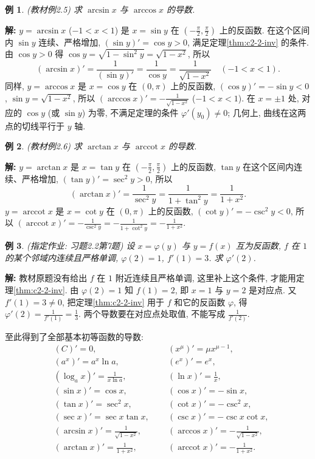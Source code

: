 \documentclass[UTF8,openany]{ctexbook}
\theoremstyle{chinesetextbook}
\newtheorem{example}{例}[section]
\newenvironment{cnsolution}{\par\indent\textbf{解:} \ignorespaces}{\par}
\begin{document}
\begin{example}\label{ex:c2-2-5}
\textnormal{(教材例2.5)} 求 $\arcsin x$ 与 $\arccos x$ 的导数.
\end{example}
\begin{cnsolution}
$y=\arcsin x$ ($-1<x<1$) 是 $x=\sin y$ 在 $\displaystyle\left(-\frac\pi2,\frac\pi2\right)$ 上的反函数. 在这个区间内 $\sin y$ 连续、严格增加, $(\sin y)'=\cos y>0$, 满足定理\ref{thm:c2-2-inv} 的条件. 由 $\cos y>0$ 得 $\cos y=\sqrt{1-\sin^2y}=\sqrt{1-x^2}$, 所以
\[
(\arcsin x)'=\frac1{(\sin y)'}=\frac1{\cos y}=\frac1{\sqrt{1-x^2}}\quad(-1<x<1).
\]
同样, $y=\arccos x$ 是 $x=\cos y$ 在 $(0,\pi)$ 上的反函数, $(\cos y)'=-\sin y<0$, $\sin y=\sqrt{1-x^2}$, 所以 $\displaystyle(\arccos x)'=-\frac1{\sqrt{1-x^2}}$ ($-1<x<1$). 在 $x=\pm1$ 处, 对应的 $\cos y$ (或 $\sin y$) 为零, 不满足定理的条件 $\varphi'(y_0)\ne0$; 几何上, 曲线在这两点的切线平行于 $y$ 轴.
\end{cnsolution}
\begin{example}\label{ex:c2-2-6}
\textnormal{(教材例2.6)} 求 $\arctan x$ 与 $\operatorname{arccot}x$ 的导数.
\end{example}
\begin{cnsolution}
$y=\arctan x$ 是 $x=\tan y$ 在 $\displaystyle\left(-\frac\pi2,\frac\pi2\right)$ 上的反函数, $\tan y$ 在这个区间内连续、严格增加, $(\tan y)'=\sec^2y>0$, 所以
\[
(\arctan x)'=\frac1{\sec^2y}=\frac1{1+\tan^2y}=\frac1{1+x^2}.
\]
$y=\operatorname{arccot}x$ 是 $x=\cot y$ 在 $(0,\pi)$ 上的反函数, $(\cot y)'=-\csc^2y<0$, 所以 $\displaystyle(\operatorname{arccot}x)'=-\frac1{\csc^2y}=-\frac1{1+\cot^2y}=-\frac1{1+x^2}$.
\end{cnsolution}
\begin{example}\label{ex:c2-h2-7}
\textnormal{(指定作业: 习题2.2第7题)} 设 $x=\varphi(y)$ 与 $y=f(x)$ 互为反函数, $f$ 在 $1$ 的某个邻域内连续且严格单调, $\varphi(2)=1$, $f'(1)=3$. 求 $\varphi'(2)$.
\end{example}
\begin{cnsolution}
教材原题没有给出 $f$ 在 $1$ 附近连续且严格单调, 这里补上这个条件, 才能用定理\ref{thm:c2-2-inv}. 由 $\varphi(2)=1$ 知 $f(1)=2$, 即 $x=1$ 与 $y=2$ 是对应点. 又 $f'(1)=3\ne0$, 把定理\ref{thm:c2-2-inv} 用于 $f$ 和它的反函数 $\varphi$, 得 $\displaystyle\varphi'(2)=\frac1{f'(1)}=\frac13$. 两个导数要在对应点处取值, 不能写成 $\displaystyle\frac1{f'(2)}$.
\end{cnsolution}
至此得到了全部基本初等函数的导数:
\[
\begin{aligned}
&(C)'=0, &&(x^\mu)'=\mu x^{\mu-1},\\
&(a^x)'=a^x\ln a, &&(e^x)'=e^x,\\
&(\log_ax)'=\frac1{x\ln a}, &&(\ln x)'=\frac1x,\\
&(\sin x)'=\cos x, &&(\cos x)'=-\sin x,\\
&(\tan x)'=\sec^2x, &&(\cot x)'=-\csc^2x,\\
&(\sec x)'=\sec x\tan x, &&(\csc x)'=-\csc x\cot x,\\
&(\arcsin x)'=\frac1{\sqrt{1-x^2}}, &&(\arccos x)'=-\frac1{\sqrt{1-x^2}},\\
&(\arctan x)'=\frac1{1+x^2},\qquad &&(\operatorname{arccot}x)'=-\frac1{1+x^2}.
\end{aligned}
\]
\end{document}
